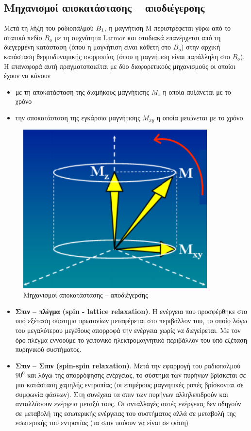 \documentclass{article}
\begin{document}
\subsection{Μηχανισμοί	αποκατάστασης	–	αποδιέγερσης}
Μετά	 τη	 λήξη	 του	 ραδιοπαλμού	 $B_{1}\\
$,	 η	 μαγνήτιση	 Μ	 περιστρέφεται	
γύρω	από	το	στατικό	πεδίο	$Β_{ο}$	με	τη	συχνότητα	Larmor	και	σταδιακά	
επανέρχεται	από	τη	διεγερμένη	κατάσταση	(όπου	η	μαγνήτιση	είναι	
κάθετη	στο	$Β_{ο}$)	στην	αρχική	κατάσταση	θερμοδυναμικής	ισορροπίας	
(όπου	η	μαγνήτιση	είναι	παράλληλη	στο	$Β_{ο}$).
 Η	 επαναφορά	 αυτή	 πραγματοποιείται	 με	
δύο	 διαφορετικούς	 μηχανισμούς	 οι	 οποίοι	
έχουν	να	κάνουν
\begin{itemize}
    \item με	τη	αποκατάσταση	της	διαμήκους	
μαγνήτισης	$M_z$	η	οποία	αυξάνεται	με	το	
χρόνο
    \item την	αποκατάσταση	της	εγκάρσια	
μαγνήτισης	$Μ_{xy}$	η	οποία	μειώνεται	με	το	
χρόνο.		
\end{itemize}
\begin{figure}[h!]	
     \centering
     
  \includegraphics[width=100mm,scale=1.4]{mxy.png}
  \caption{Μηχανισμοί	αποκατάστασης	–	αποδιέγερσης}
\end{figure}
\clearpage

\begin{itemize}
    \item \textbf{Σπιν	–	πλέγμα	 (spin - lattice relaxation)}.	Η	ενέργεια	που	προσφέρθηκε	
στο	 υπό	 εξέταση	 σύστημα	 πρωτονίων	 μεταφέρεται	 στο	 περιβάλλον	
του,	 το	 οποίο	 λόγω	 του	 μεγαλύτερου	 μεγέθους	 απορροφά	 την	
ενέργεια	 χωρίς	 να	 διεγείρεται.	 Με	 τον	 όρο	 πλέγμα	 εννοούμε	 το	
γειτονικό	 ηλεκτρομαγνητικό	 περιβάλλον	 του	 υπό	 εξέταση	 πυρηνικού	
συστήματος.		
\item\textbf{ Σπιν	–	Σπιν	(spin-spin relaxation)}. Μετά	την	εφαρμογή	του	ραδιοπαλμού
$90^0$	 και	 λόγω	 της	 απορρόφησης	 ενέργειας,	 το	 σύστημα	 των	 πυρήνων	
βρίσκεται	 σε	 μια	 κατάσταση	 χαμηλής	 εντροπίας	 (οι	 επιμέρους	
μαγνητικές	 ροπές	 βρίσκονται	 σε	 συμφωνία	φάσεων).	Στη	 συνέχεια	 τα	
σπιν	των	πυρήνων	αλληλεπιδρούν	 	και	ανταλλάσουν	ενέργεια	μεταξύ	
τους.	 Οι	 ανταλλαγές	 αυτές	 ενέργειας	 δεν	 οδηγούν	 σε	 μεταβολή	 της	
εσωτερικής	 ενέργειας	 του	 συστήματος	 αλλά	 σε	 μεταβολή	 της	
εσωτερικής	του	εντροπίας	(τα	σπιν	παύουν	να	είναι	σε	φάση)	
\end{itemize}
\end{document}
